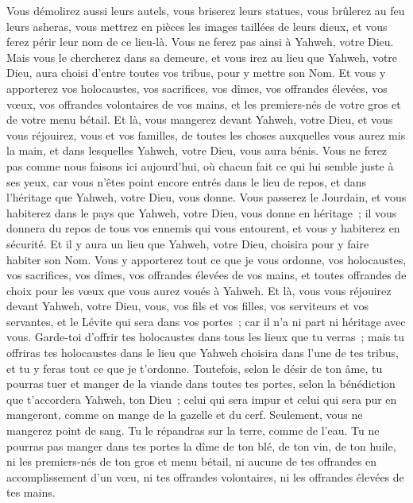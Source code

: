 \begin{multicols}{2}
Vous démolirez aussi leurs autels, vous briserez leurs statues, vous brûlerez au feu leurs asheras, vous mettrez en pièces les images taillées de leurs dieux, et vous ferez périr leur nom de ce lieu-là.
Vous ne ferez pas ainsi à Yahweh, votre Dieu.
Mais vous le chercherez dans sa demeure, et vous irez au lieu que Yahweh, votre Dieu, aura choisi d'entre toutes vos tribus, pour y mettre son Nom.
Et vous y apporterez vos holocaustes, vos sacrifices, vos dîmes, vos offrandes élevées, vos vœux, vos offrandes volontaires de vos mains, et les premiers-nés de votre gros et de votre menu bétail.
Et là, vous mangerez devant Yahweh, votre Dieu, et vous vous réjouirez, vous et vos familles, de toutes les choses auxquelles vous aurez mis la main, et dans lesquelles Yahweh, votre Dieu, vous aura bénis.
Vous ne ferez pas comme nous faisons ici aujourd'hui, où chacun fait ce qui lui semble juste à ses yeux,
car vous n'êtes point encore entrés dans le lieu de repos, et dans l'héritage que Yahweh, votre Dieu, vous donne.
Vous passerez le Jourdain, et vous habiterez dans le pays que Yahweh, votre Dieu, vous donne en héritage~; il vous donnera du repos de tous vos ennemis qui vous entourent, et vous y habiterez en sécurité.
Et il y aura un lieu que Yahweh, votre Dieu, choisira pour y faire habiter son Nom. Vous y apporterez tout ce que je vous ordonne, vos holocaustes, vos sacrifices, vos dîmes, vos offrandes élevées de vos mains, et toutes offrandes de choix pour les vœux que vous aurez voués à Yahweh.
Et là, vous vous réjouirez devant Yahweh, votre Dieu, vous, vos fils et vos filles, vos serviteurs et vos servantes, et le Lévite qui sera dans vos portes~; car il n'a ni part ni héritage avec vous.
Garde-toi d'offrir tes holocaustes dans tous les lieux que tu verras~;
mais tu offriras tes holocaustes dans le lieu que Yahweh choisira dans l'une de tes tribus, et tu y feras tout ce que je t'ordonne.
Toutefois, selon le désir de ton âme, tu pourras tuer et manger de la viande dans toutes tes portes, selon la bénédiction que t'accordera Yahweh, ton Dieu~; celui qui sera impur et celui qui sera pur en mangeront, comme on mange de la gazelle et du cerf.
Seulement, vous ne mangerez point de sang. Tu le répandras sur la terre, comme de l'eau.
Tu ne pourras pas manger dans tes portes la dîme de ton blé, de ton vin, de ton huile, ni les premiers-nés de ton gros et menu bétail, ni aucune de tes offrandes en accomplissement d'un vœu, ni tes offrandes volontaires, ni les offrandes élevées de tes mains.

\end{multicols}
